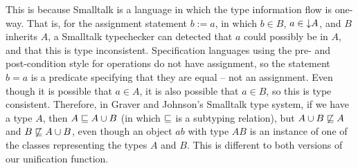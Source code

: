 This is because Smalltalk is a language in which the type information
flow is one-way. That is, for the assignment statement $b := a$, in
which $b \in B$, $a \in \mathord\downarrow A$, and $B$ inherits $A$, a Smalltalk
typechecker can detected that $a$ could possibly be in $A$, and that
this is type inconsistent. Specification languages using the pre- and
post-condition style for operations do not have assignment, so the
statement $b = a$ is a predicate specifying that they are equal -- not
an assignment. Even though it is possible that $a \in A$, it is also
possible that $a \in B$, so this is type consistent. Therefore, in
Graver and Johnson's Smalltalk type system, if we have a type $A$,
then $A \subtypeeq A \classuni B$ (in which $\mathrel{\mathstrut{\sqsubseteq}}$ is a
subtyping relation), but $A \classuni B \not\subtypeeq A$ and $B
\not\subtypeeq A \classuni B$, even though an object $ab$ with type
$AB$ is an instance of one of the classes representing the types $A$
and $B$. This is different to both versions of our unification
function.
